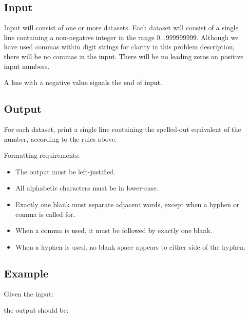 \subsection*{Input}

Input will consist of one or more datasets. Each dataset will consist
of a single line containing a non-negative integer in the range
$0\ldots \num{999999999}$. Although we have used commas within digit
strings for clarity in this problem description, there will be no
commas in the input. There will be no leading zeros on positive input
numbers.

A line with a negative value signals the end of input.

\subsection*{Output}

For each dataset, print a single line containing the spelled-out
equivalent of the number, according to the rules above.

Formatting requirements:
\begin{itemize}
\item The output must be left-justified.
\item All alphabetic characters must be in lower-case.
\item Exactly one blank must separate adjacent words, except when a
  hyphen or comma is called for.
\item When a comma is used, it must be followed by exactly one blank.
\item When a hyphen is used, no blank space appears to either side of
  the hyphen.
\end{itemize}


\subsection*{Example}

Given the input:



the output should be:




